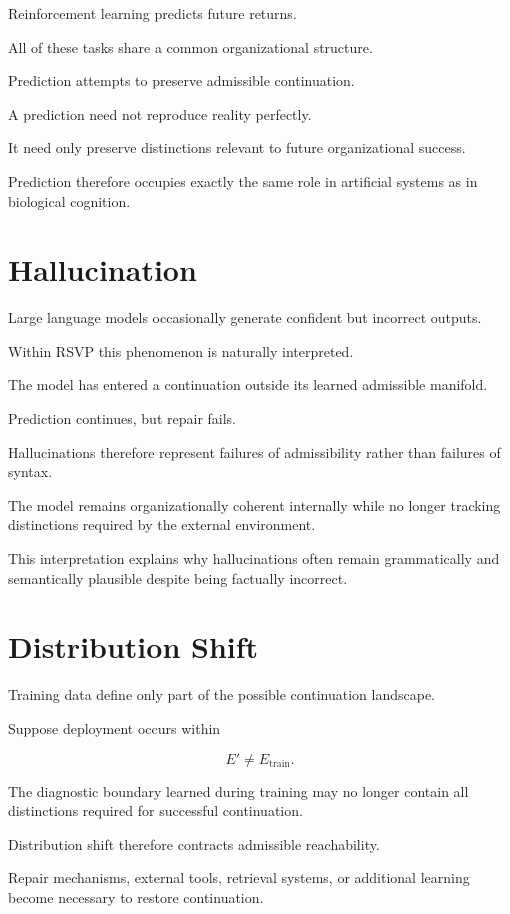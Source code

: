 \documentclass[11pt,oneside]{book}
\numberwithin{equation}{chapter}
\theoremstyle{definition}
\theoremstyle{plain}
\begin{document}
Reinforcement learning predicts future returns.

All of these tasks share a common organizational structure.

Prediction attempts to preserve admissible continuation.

A prediction need not reproduce reality perfectly.

It need only preserve distinctions relevant to future organizational
success.

Prediction therefore occupies exactly the same role in artificial systems as
in biological cognition.

\section{Hallucination}

Large language models occasionally generate confident but incorrect
outputs.

Within RSVP this phenomenon is naturally interpreted.

The model has entered a continuation outside its learned admissible
manifold.

Prediction continues, but repair fails.

Hallucinations therefore represent failures of admissibility rather than
failures of syntax.

The model remains organizationally coherent internally while no longer
tracking distinctions required by the external environment.

This interpretation explains why hallucinations often remain grammatically
and semantically plausible despite being factually incorrect.

\section{Distribution Shift}

Training data define only part of the possible continuation landscape.

Suppose deployment occurs within

\[
E'
\neq
E_{\mathrm{train}}.
\]

The diagnostic boundary learned during training may no longer contain all
distinctions required for successful continuation.

Distribution shift therefore contracts admissible reachability.

Repair mechanisms, external tools, retrieval systems, or additional learning
become necessary to restore continuation.
\end{document}
